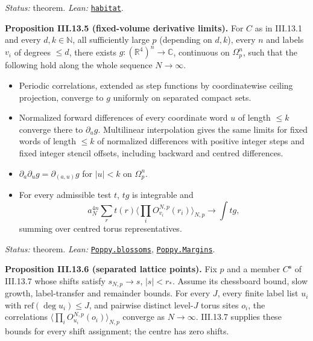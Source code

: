 \documentclass[
  letterpaper,
  11pt]{article}
\providecommand{\tightlist}{%
  \setlength{\itemsep}{0pt}\setlength{\parskip}{0pt}}
\begin{document}
\emph{Status:} theorem. \emph{Lean:}
\href{https://github.com/yang-mills-group/OpenAI-YM-20261028/blob/3456e5e75cf8d4cd558955a5c7638fba2d68f464/YM/SharpGram/Measured.lean\#L11-L36}{\texttt{habitat}}.

\textbf{Proposition III.13.5 (fixed-volume derivative limits).} For
\(C\) as in III.13.1 and every \(d,k\in\mathbb N\), all sufficiently
large \(p\) (depending on \(d,k\)), every \(n\) and labels \(v_i\) of
degrees \(\le d\), there exists \(g:(\mathbb R^4)^n\to\mathbb C\),
continuous on \(\Omega_p^n\), such that the following hold along the
whole sequence \(N\to\infty\).

\begin{itemize}
\tightlist
\item
  Periodic correlations, extended as step functions by coordinatewise
  ceiling projection, converge to \(g\) uniformly on separated compact
  sets.
\item
  Normalized forward differences of every coordinate word \(u\) of
  length \(\le k\) converge there to \(\partial_ug\). Multilinear
  interpolation gives the same limits for fixed words of length
  \(\le k\) of normalized differences with positive integer steps and
  fixed integer stencil offsets, including backward and centred
  differences.
\item
  \(\partial_a\partial_ug=\partial_{(a,u)}g\) for \(|u|<k\) on
  \(\Omega_p^n\).
\item
  For every admissible test \(t\), \(tg\) is integrable and
  \[a_N^{4n}\sum_r t(r)\Big\langle\prod_iO_{v_i}^{N,p}(r_i)\Big\rangle_{N,p}\longrightarrow\int tg,\]
  summing over centred torus representatives.
\end{itemize}

\emph{Status:} theorem. \emph{Lean:}
\href{https://github.com/yang-mills-group/OpenAI-YM-20261028/blob/3456e5e75cf8d4cd558955a5c7638fba2d68f464/YM/UVExtension/Poppy/Fountain.lean\#L96-L108}{\texttt{Poppy.blossoms}},
\href{https://github.com/yang-mills-group/OpenAI-YM-20261028/blob/3456e5e75cf8d4cd558955a5c7638fba2d68f464/YM/UVExtension/Poppy/Fountain.lean\#L16-L21}{\texttt{Poppy.Margins}}.

\textbf{Proposition III.13.6 (separated lattice points).} Fix \(p\) and
a member \(C^{\mathbf s}\) of III.13.7 whose shifts satisfy
\(s_{N,p}\to s\), \(|s|<r_*\). Assume its chessboard bound, slow growth,
label-transfer and remainder bounds. For every \(J\), every finite label
list \(u_i\) with \(\mathrm{ref}(\deg u_i)\le J\), and pairwise distinct
level-\(J\) torus sites \(o_i\), the correlations
\(\langle\prod_iO_{u_i}^{N,p}(o_i)\rangle_{N,p}\) converge as
\(N\to\infty\). III.13.7 supplies these bounds for every shift
assignment; the centre has zero shifts.
\end{document}
